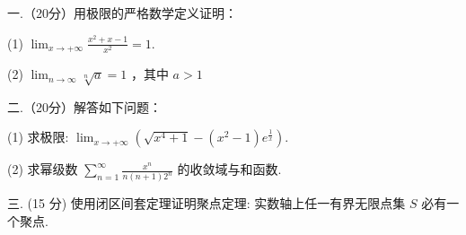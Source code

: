 \documentclass{examcollection}
\begin{document}
{\begin{minipage}{\textwidth}
\smallskip
一.（20分）用极限的严格数学定义证明：\par
(1) $\lim_{x\to +\infty}\frac{x^2 + x - 1}{x^2} = 1.$\par
(2) $\lim_{n\to \infty}\sqrt[n]{a} = 1$ ，其中 $a > 1$\par
二.（20分）解答如下问题：\par
(1) 求极限: $\lim_{x \to +\infty} \left( \sqrt{x^4 + 1} - (x^2 - 1)e^{\frac{1}{x}} \right)$.\par
(2) 求幂级数 $\sum_{n=1}^{\infty} \frac{x^n}{n(n+1)2^n}$ 的收敛域与和函数.\par
三. (15 分) 使用闭区间套定理证明聚点定理: 实数轴上任一有界无限点集 $S$ 必有一个聚点.\par
\end{minipage}}
\ifdim\dimexpr\ht\proofbox+\dp\proofbox\relax>\textheight
\noindent\resizebox{!}{\textheight}{\usebox{\proofbox}}\else\noindent\usebox{\proofbox}\fi\clearpage
\end{document}
